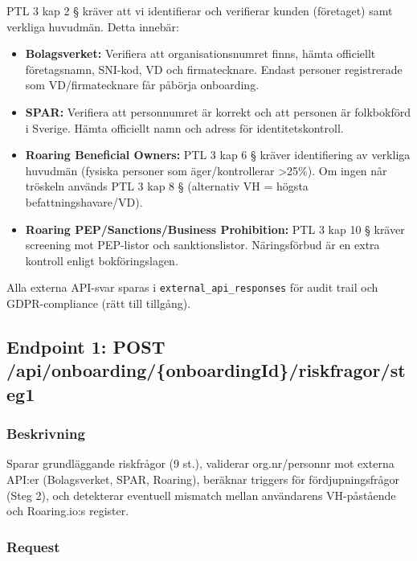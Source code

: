 \documentclass[12pt,a4paper]{article}
\begin{document}
PTL 3 kap 2 § kräver att vi identifierar och verifierar kunden (företaget) samt verkliga huvudmän. Detta innebär:

\begin{itemize}[noitemsep]
  \item \textbf{Bolagsverket:} Verifiera att organisationsnumret finns, hämta officiellt företagsnamn, SNI-kod, VD och firmatecknare. Endast personer registrerade som VD/firmatecknare får påbörja onboarding.
  \item \textbf{SPAR:} Verifiera att personnumret är korrekt och att personen är folkbokförd i Sverige. Hämta officiellt namn och adress för identitetskontroll.
  \item \textbf{Roaring Beneficial Owners:} PTL 3 kap 6 § kräver identifiering av verkliga huvudmän (fysiska personer som äger/kontrollerar >25\%). Om ingen når tröskeln används PTL 3 kap 8 § (alternativ VH = högsta befattningshavare/VD).
  \item \textbf{Roaring PEP/Sanctions/Business Prohibition:} PTL 3 kap 10 § kräver screening mot PEP-listor och sanktionslistor. Näringsförbud är en extra kontroll enligt bokföringslagen.
\end{itemize}

Alla externa API-svar sparas i \texttt{external\_api\_responses} för audit trail och GDPR-compliance (rätt till tillgång).

\subsection{Endpoint 1: POST /api/onboarding/\{onboardingId\}/riskfragor/steg1}

\subsubsection{Beskrivning}

Sparar grundläggande riskfrågor (9 st.), validerar org.nr/personnr mot externa API:er (Bolagsverket, SPAR, Roaring), beräknar triggers för fördjupningsfrågor (Steg 2), och detekterar eventuell mismatch mellan användarens VH-påstående och Roaring.io:s register.

\subsubsection{Request}
\end{document}
